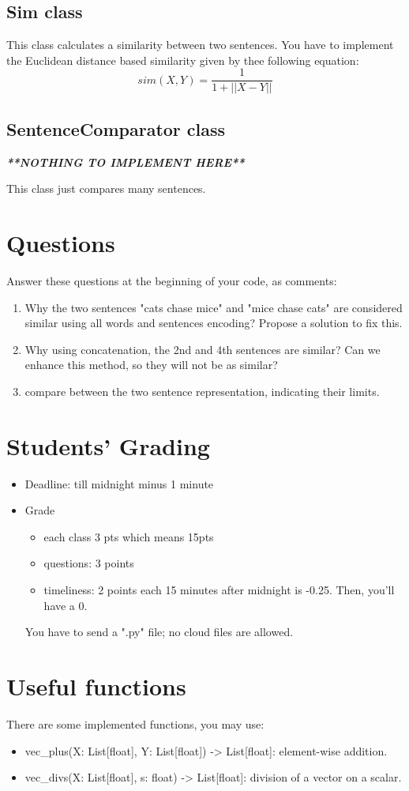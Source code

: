 \documentclass[11pt, a4paper]{article}
\begin{document}
\subsection{Sim class}

This class calculates a similarity between two sentences.
You have to implement the Euclidean distance based similarity given by thee following equation:
\[sim(X, Y) = \frac{1}{ 1 + ||X-Y||}\] 

\subsection{SentenceComparator class}

\textit{\textbf{**NOTHING TO IMPLEMENT HERE**}}

This class just compares many sentences.

\section{Questions}

Answer these questions at the beginning of your code, as comments:
\begin{enumerate}
	\item Why the two sentences "cats chase mice" and "mice chase cats" are considered similar using all words and sentences encoding?
	Propose a solution to fix this.
	
	\item Why using concatenation, the 2nd and 4th sentences are similar?
	Can we enhance this method, so they will not be as similar?
	
	\item compare between the two sentence representation, indicating their limits.
	
\end{enumerate}


\section{Students' Grading}

\begin{itemize}
	\item Deadline: till midnight minus 1 minute
	\item Grade
	\begin{itemize}
		\item each class 3 pts which means 15pts
		\item questions: 3 points
		\item timeliness: 2 points
		each 15 minutes after midnight is -0.25.
		Then, you'll have a 0.
	\end{itemize}

	You have to send a ".py" file; no cloud files are allowed.
\end{itemize}

\section{Useful functions}

There are some implemented functions, you may use:
\begin{itemize}
	\item vec\_plus(X: List[float], Y: List[float]) -> List[float]: element-wise addition.
	\item vec\_divs(X: List[float], s: float) -> List[float]: division of a vector on a scalar.
\end{itemize}
\end{document}
